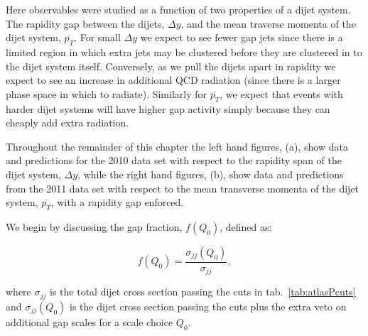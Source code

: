 	Here observables were studied
	as a function of two properties of a dijet system.  The rapidity gap between the dijets,
	$\Delta y$, and the mean traverse momenta of the dijet system, $\overline{p_T}$.  For small
	$\Delta y$ we expect to see fewer gap jets since there is
	a limited region in which extra jets may be clustered before they are clustered in
	to the dijet system itself.   Conversely, as we pull the dijets apart in rapidity
	we expect to see an increase in additional QCD radiation (since there is a larger
	phase space in which to radiate).  Similarly for $\overline{p_T}$, we expect that
	events with harder dijet systems will have higher gap activity simply because they
	can cheaply add extra radiation.

	Throughout the remainder of this chapter the  left hand figures, (a), show data and
	predictions for the 2010 data set with respect to the rapidity span of the dijet
	system, $\Delta y$, while the right hand figures, (b), show data and predictions from the
	2011 data set with respect to the mean transverse momenta of the dijet system,
	$\overline{p_T}$, with a rapidity gap enforced.

	We begin by discussing the gap fraction, $f(Q_0)$, defined as:

	\begin{equation}
		f(Q_0) = \frac{\sigma_{jj}(Q_0)}{\sigma_{jj}},
	\end{equation}

	where $\sigma_{jj}$ is the total dijet cross section passing the cuts in
	tab.~\eqref{tab:atlasPcuts} and $\sigma_{jj}(Q_0)$ is the dijet cross section passing
	the cuts plus the extra veto on additional gap scales for a scale choice $Q_0$.

